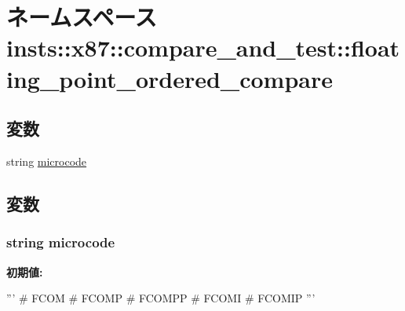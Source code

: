 \hypertarget{namespaceinsts_1_1x87_1_1compare__and__test_1_1floating__point__ordered__compare}{
\section{ネームスペース insts::x87::compare\_\-and\_\-test::floating\_\-point\_\-ordered\_\-compare}
\label{namespaceinsts_1_1x87_1_1compare__and__test_1_1floating__point__ordered__compare}
}
\subsection*{変数}
\begin{DoxyCompactItemize}
\item 
string \hyperlink{namespaceinsts_1_1x87_1_1compare__and__test_1_1floating__point__ordered__compare_a770f11a173e99389a8802f0107ed8f52}{microcode}
\end{DoxyCompactItemize}


\subsection{変数}
\hypertarget{namespaceinsts_1_1x87_1_1compare__and__test_1_1floating__point__ordered__compare_a770f11a173e99389a8802f0107ed8f52}{
\subsubsection[{microcode}]{\setlength{\rightskip}{0pt plus 5cm}string {\bf microcode}}}
\label{namespaceinsts_1_1x87_1_1compare__and__test_1_1floating__point__ordered__compare_a770f11a173e99389a8802f0107ed8f52}
{\bfseries 初期値:}
\begin{DoxyCode}
'''
# FCOM
# FCOMP
# FCOMPP
# FCOMI
# FCOMIP
'''
\end{DoxyCode}
